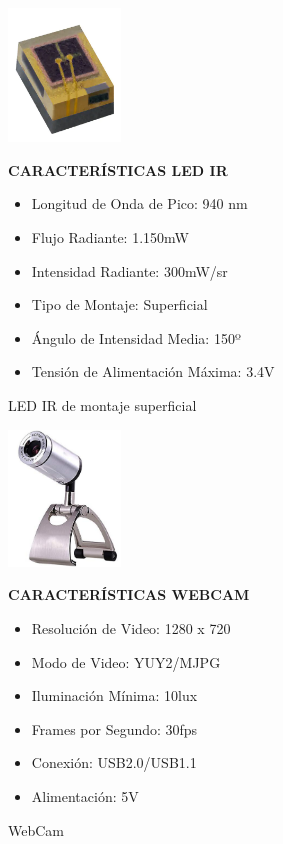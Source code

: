 \begin{figure}[htb]
\centering
\begin{minipage}{.4\textwidth}
    \centering
    \includegraphics[width=3cm]{figures/4.4.png}
    \caption{LED IR de montaje superficial}
    \label{fig:4.4}
\end{minipage}
\begin{minipage}{.5\textwidth} 
\setlength{\parskip}{0.2cm}
\textbf{CARACTERÍSTICAS LED IR}
\begin{itemize}
    \item Longitud de Onda de Pico: 940 nm
    \item Flujo Radiante: 1.150mW
    \item Intensidad Radiante: 300mW/sr
    \item Tipo de Montaje: Superficial
    \item Ángulo de Intensidad Media: 150º
    \item Tensión de Alimentación Máxima: 3.4V
\end{itemize}
\end{minipage}
\end{figure}

\begin{figure}[htb]
\centering
\begin{minipage}{.4\textwidth}
    \centering
    \includegraphics[width=3cm]{figures/4.5.png}
    \caption{WebCam}
    \label{fig:4.5}
\end{minipage}
\begin{minipage}{.5\textwidth} 
\setlength{\parskip}{0.2cm}
\textbf{CARACTERÍSTICAS WEBCAM}
\begin{itemize}
    \item Resolución de Video: 1280 x 720
    \item Modo de Video: YUY2/MJPG
    \item Iluminación Mínima: 10lux
    \item Frames por Segundo: 30fps
    \item Conexión: USB2.0/USB1.1
    \item Alimentación: 5V
\end{itemize}
\end{minipage}
\end{figure}

